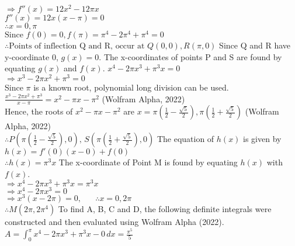 \documentclass{homework}
\begin{document}
\begin{flushleft}
    $\Rightarrow f''(x)=12x^2-12 \pi x  $
    \\
    $f''(x)=12x(x-\pi)=0 $ \\
    $\therefore x=0, \pi$ \\
    $\text{Since }f(0)=0, f(\pi)=\pi^4-2\pi^4+\pi^4=0$ \\
    $\therefore \text{Points of inflection Q and R, occur at }Q(0,0), R(\pi,0)$ \linebreak \linebreak
    Since Q and R have y-coordinate $0$, $g(x)=0$.
    The x-coordinates of points P and S are found by equating $g(x)$ and $ f(x)$.
    \linebreak \linebreak
    $x^4-2\pi x^3+\pi^3x=0$ \\
    $\Rightarrow x^3-2\pi x^2+\pi^3=0$ \\
    Since $\pi$ is a known root, polynomial long division can be used. \linebreak \linebreak
    $\frac{x^3-2\pi x^2+\pi^3}{x-\pi}=x^2-\pi x-\pi^2$ (Wolfram Alpha, 2022)\\
    Hence, the roots of $x^2-\pi x-\pi^2$ are $x=\pi(\frac{1}{2}-\frac{\sqrt{5}}{2}), \pi(\frac{1}{2}+\frac{\sqrt{5}}{2})$ (Wolfram Alpha, 2022) \\
    $\therefore P\left(\pi\left(\frac{1}{2}-\frac{\sqrt{5}}{2}\right),0\right), \, S\left(\pi\left(\frac{1}{2}+\frac{\sqrt{5}}{2}\right),0\right)$ \linebreak \linebreak
    The equation of $h(x)$ is given by $h(x)=f'(0)(x-0)+f(0)$ \\
    $\therefore h(x)=\pi^3x$ \linebreak \linebreak
    The x-coordinate of Point M is found by equating $h(x)$ with $f(x)$. \\
    $\Rightarrow x^4-2\pi x^3+\pi^3 x=\pi^3 x$ \\
    $\Rightarrow x^4-2\pi x^3=0 $ \\
    $\Rightarrow x^3(x-2\pi)=0, \, \, \, \, \, \, \, \, \, \, \therefore x=0, 2\pi $ \\
    $\therefore M(2\pi, 2\pi^4)$ \linebreak \linebreak
    To find A, B, C and D, the following definite integrals were constructed and then evaluated using Wolfram Alpha (2022). \\
    $A=\int_0^{\pi} x^4-2\pi x^3+\pi^3x -0 \, dx=\frac{\pi^5}{5}$ \, \,  \\

\end{flushleft}
\end{document}
